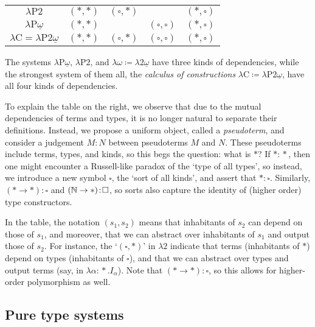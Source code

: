 \documentclass[reqno, twoside]{article}
\begin{document}
\begin{center}
\begin{minipage}{0.5\textwidth}
\begin{center}
\begin{tabular}{c|cccc}
                    $\lambda\mathrm{P}2$                                     & $(\ast,\ast)$ & $(\square,\ast)$ &                     & $(\ast,\square)$ \\
                    $\lambda\mathrm{P}\underline{\omega}$                    & $(\ast,\ast)$ &                  & $(\square,\square)$ & $(\ast,\square)$ \\
                    $\lambda\mathrm{C}=\lambda\mathrm{P}2\underline{\omega}$ & $(\ast,\ast)$ & $(\square,\ast)$ & $(\square,\square)$ & $(\ast,\square)$ \\
                \end{tabular}
            \end{center}
        \end{minipage}
    \end{center}
    The systems $\lambda\mathrm{P}\underline{\omega}$, $\lambda\mathrm{P}2$, and $\lambda\omega\coloneqq\lambda2\underline{\omega}$ have three kinds of dependencies, while the strongest system of them all, the \textit{calculus of constructions} $\lambda\mathrm{C}\coloneqq\lambda\mathrm{P}2\underline{\omega}$, have all four kinds of dependencies.

    To explain the table on the right, we observe that due to the mutual dependencies of terms and types, it is no longer natural to separate their definitions. Instead, we propose a uniform object, called a \textit{pseudoterm}, and consider a judgement $M\!:\!N$ between pseudoterms $M$ and $N$. These pseudoterms include terms, types, and kinds, so this begs the question: what is $\ast$? If $\ast\!:\!\ast$, then one might encounter a Russell-like paradox of the `type of all types', so instead, we introduce a new symbol $\square$, the `sort of all kinds', and assert that $\ast\!:\!\square$. Similarly, $(\ast\to\ast)\!:\!\square$ and $(\mathbb{N}\to\ast)\!:\!\square$, so sorts also capture the identity of (higher order) type constructors.

    In the table, the notation $(s_1,s_2)$ means that inhabitants of $s_2$ can depend on those of $s_1$, and moreover, that we can abstract over inhabitants of $s_1$ and output those of $s_2$. For instance, the `$(\square,\ast)$' in $\lambda2$ indicate that terms (inhabitants of $\ast$) depend on types (inhabitants of $\square$), and that we can abstract over types and output terms (say, in $\lambda\alpha\!:\!\ast.I_\alpha$). Note that $(\ast\to\ast)\!:\!\square$, so this allows for higher-order polymorphism as well.

    \subsection*{Pure type systems}
\end{document}
